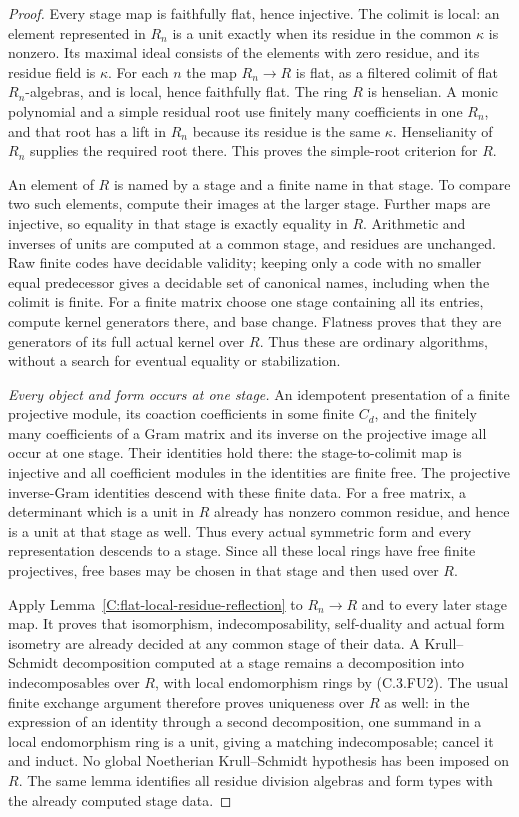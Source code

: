 \begin{proof}
Every stage map is faithfully flat, hence injective.
The colimit is local: an element represented in $R_n$
is a unit exactly when its residue in the common
$\kappa$ is nonzero.  Its maximal ideal consists of
the elements with zero residue, and its residue
field is $\kappa$.
For each $n$ the map $R_n\to R$ is flat, as a
filtered colimit of flat $R_n$-algebras, and is
local, hence faithfully flat.
The ring $R$ is henselian.  A monic polynomial
and a simple residual root use finitely many
coefficients in one $R_n$, and that root has a
lift in $R_n$ because its residue is the same
$\kappa$.  Henselianity of $R_n$ supplies the
required root there.  This proves the simple-root
criterion for $R$.

An element of $R$ is named by a stage and a
finite name in that stage.  To compare two such
elements, compute their images at the larger
stage.  Further maps are injective, so equality
in that stage is exactly equality in $R$.
Arithmetic and inverses of units are computed
at a common stage, and residues are unchanged.
Raw finite codes have decidable validity; keeping
only a code with no smaller equal predecessor
gives a decidable set of canonical names, including
when the colimit is finite.
For a finite matrix choose one stage containing
all its entries, compute kernel generators there,
and base change.  Flatness proves that they are
generators of its full actual kernel over $R$.
Thus these are ordinary algorithms, without a
search for eventual equality or stabilization.

\emph{Every object and form occurs at one stage.}
An idempotent presentation of a finite projective
module, its coaction coefficients in some finite
$C_d$, and the finitely many coefficients of a
Gram matrix and its inverse on the projective
image all occur at one stage.
Their identities hold there: the stage-to-colimit
map is injective and all coefficient modules
in the identities are finite free.
The projective inverse-Gram identities descend
with these finite data.  For a free matrix, a
determinant which is a unit in $R$ already has
nonzero common residue, and hence is a unit
at that stage as well.
Thus every actual symmetric form and every
representation descends to a stage.
Since all these local rings have free finite
projectives, free bases may be chosen in that
stage and then used over $R$.

Apply Lemma~\ref{C:flat-local-residue-reflection}
to $R_n\to R$ and to every later stage map.
It proves that isomorphism, indecomposability,
self-duality and actual form isometry are already
decided at any common stage of their data.
A Krull--Schmidt decomposition computed at a
stage remains a decomposition into indecomposables
over $R$, with local endomorphism rings by
(C.3.FU2).  The usual finite exchange argument
therefore proves uniqueness over $R$ as well:
in the expression of an identity through a
second decomposition, one summand in a local
endomorphism ring is a unit, giving a matching
indecomposable; cancel it and induct.
No global Noetherian Krull--Schmidt hypothesis
has been imposed on $R$.
The same lemma identifies all residue division
algebras and form types with the already computed
stage data.


\end{proof}
